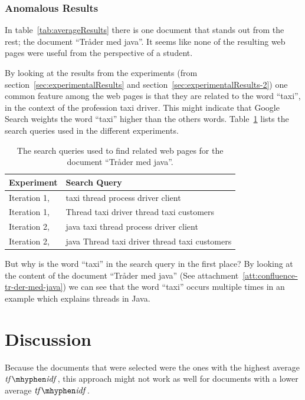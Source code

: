 \documentclass[a4paper]{book}
\newcommand\tfidf{\mathit{tf\mhyphen idf}}
\begin{document}
\subsubsection{Anomalous Results}

In table~\ref{tab:averageResults} there is one document that stands out from the rest; the document ``Tråder med java''. It seems like none of the resulting web pages were useful from the perspective of a student.

By looking at the results from the experiments (from section~\ref{sec:experimentalResults} and section~\ref{sec:experimentalResults-2}) one common feature among the web pages is that they are related to the word ``taxi'', in the context of the profession taxi driver. This might indicate that Google Search weights the word ``taxi'' higher than the others words. Table~\ref{tab:searchQueries-tr-der-med-java} lists the search queries used in the different experiments.
\begin{table}[H]
\centering
\begin{tabular}{|l|l|}
\hline\hline
    Experiment & Search Query \\
\hline
    Iteration 1, \nameref{subsec:experiments-en} & taxi thread process driver client \\
    Iteration 1, \nameref{subsec:experiments-no} & Thread taxi driver thread taxi customers \\
    Iteration 2, \nameref{subsec:experiments-en2} & java taxi thread process driver client \\
    Iteration 2, \nameref{subsec:experiments-no2} & java Thread taxi driver thread taxi customers \\
\hline\hline
\end{tabular}
\caption{The search queries used to find related web pages for the document ``Tråder med java''.}
\label{tab:searchQueries-tr-der-med-java}
\end{table}

But why is the word ``taxi'' in the search query in the first place? By looking at the content of the document ``Tråder med java'' (See attachment~\ref{att:confluence-tr-der-med-java}) we can see that the word ``taxi'' occurs multiple times in an example which explains threads in Java.

\section{Discussion}
\label{sec:discussion}

Because the documents that were selected were the ones with the highest average $\tfidf$, this approach might not work as well for documents with a lower average $\tfidf$.
\end{document}
